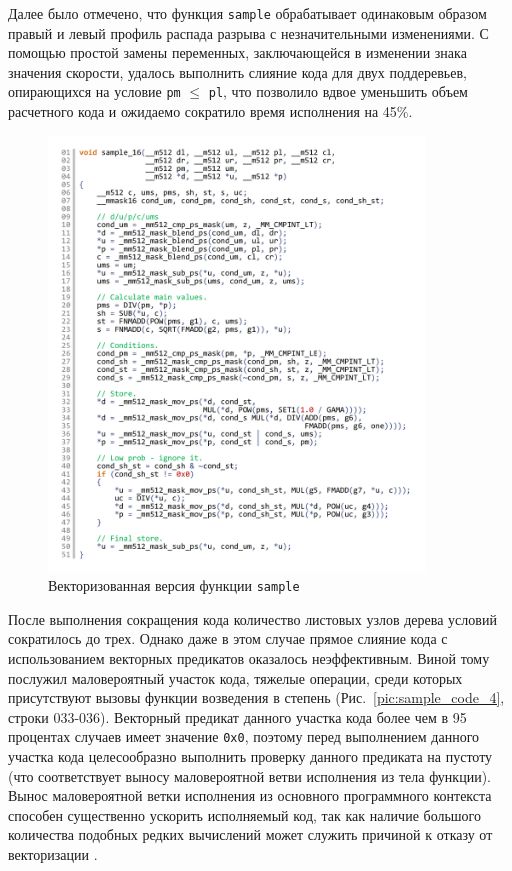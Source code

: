 \documentclass[utf8]{psta}
\begin{document}
Далее было отмечено, что функция \texttt{sample} обрабатывает одинаковым образом правый и левый профиль распада разрыва с незначительными изменениями. С помощью простой замены переменных, заключающейся в изменении знака значения скорости, удалось выполнить слияние кода для двух поддеревьев, опирающихся на условие \texttt{pm} $\le$ \texttt{pl}, что позволило вдвое уменьшить объем расчетного кода и ожидаемо сократило время исполнения на 45\%. 

\begin{figure}
\includegraphics[width=10cm]{pics/pic_sample_16_code}
\caption{Векторизованная версия функции \texttt{sample}}
\label{pic:sample_16_code}
\end{figure}

После выполнения сокращения кода количество листовых узлов дерева условий сократилось до трех. Однако даже в этом случае прямое слияние кода с использованием векторных предикатов оказалось неэффективным.
Виной тому послужил маловероятный участок кода, тяжелые операции, среди которых присутствуют вызовы функции возведения в степень (Рис.~\ref{pic:sample_code_4}, строки 033-036).
Векторный предикат данного участка кода более чем в 95 процентах случаев имеет значение \texttt{0x0}, поэтому перед выполнением данного участка кода целесообразно выполнить проверку данного предиката на пустоту (что соответствует выносу маловероятной ветви исполнения из тела функции).
Вынос маловероятной ветки исполнения из основного программного контекста способен существенно ускорить исполняемый код, так как наличие большого количества подобных редких вычислений может служить причиной к отказу от векторизации \cite{RybLowProb}.
\end{document}
